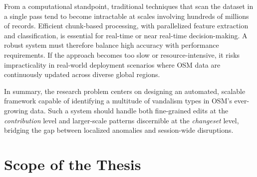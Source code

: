 \documentclass[
    13pt, %
    a4paper, %
    DIV14, %
    listof=totoc, %
    bibliography=totoc, %
    index=totoc, %
    headsepline
]{scrreprt}
\begin{document}
From a computational standpoint, traditional techniques that scan the dataset in a single pass tend to become intractable at scales involving hundreds of millions of records. Efficient chunk-based processing, with parallelized feature extraction and classification, is essential for real-time or near real-time decision-making. A robust system must therefore balance high accuracy with performance requirements. If the approach becomes too slow or resource-intensive, it risks impracticality in real-world deployment scenarios where OSM data are continuously updated across diverse global regions.

In summary, the research problem centers on designing an automated, scalable framework capable of identifying a multitude of vandalism types in OSM’s ever-growing data. Such a system should handle both fine-grained edits at the \emph{contribution} level and larger-scale patterns discernible at the \emph{changeset} level, bridging the gap between localized anomalies and session-wide disruptions.

\section{Scope of the Thesis}
\label{sec:thesis_scope}
\end{document}
